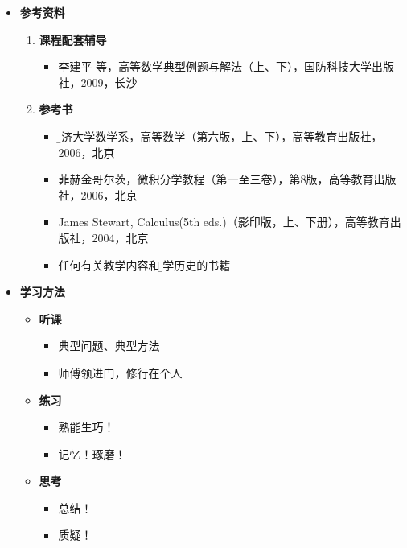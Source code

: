 \begin{itemize}
	\item {\bf 参考资料}
  	\begin{enumerate}
		\item {\bf 课程配套辅导}
	  	\begin{itemize}
	    	\item {李建平 等，高等数学典型例题与解法（上、下），国防科技大学出版社，2009，长沙} 
	  	\end{itemize}
  		\item {\bf 参考书} 
  		\begin{itemize}
	    	\item {\b 同济大学数学系，高等数学（第六版，上、下），高等教育出版社，2006，北京} 
	    	\item 菲赫金哥尔茨，微积分学教程（第一至三卷），第8版，高等教育出版社，2006，北京 
	    	\item James Stewart, Calculus(5th eds.)（影印版，上、下册），高等教育出版社，2004，北京
	    	\item 任何有关教学内容和{\b 数学历史}的书籍
  		\end{itemize}
	\end{enumerate}
	  \item {\bf 学习方法}
	\begin{itemize}
	  		\item {\bf 听课}
		\begin{itemize}
	  		  \item 典型问题、典型方法
	    	  \item 师傅领进门，修行在个人
	 	\end{itemize}
	  		\item {\bf 练习}
	 	\begin{itemize}
	    		\item 熟能生巧！
	    		\item 记忆！琢磨！
	  	\end{itemize}
	  		\item {\bf 思考}
	  	\begin{itemize}
	    		\item 总结！
	    		\item 质疑！
	  	\end{itemize}
	\end{itemize}
\end{itemize}

